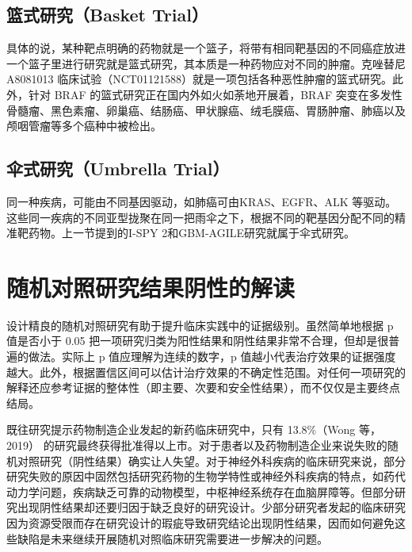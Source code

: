 \documentclass[
  chinese-hans,
  letterpaper,
  DIV=11,
  numbers=noendperiod]{scrreprt}
\begin{document}
\subsection{篮式研究（Basket
Trial）}\label{ux7beeux5f0fux7814ux7a76basket-trial}

具体的说，某种靶点明确的药物就是一个篮子，将带有相同靶基因的不同癌症放进一个篮子里进行研究就是篮式研究，其本质是一种药物应对不同的肿瘤。克唑替尼
A8081013
临床试验（NCT01121588）就是一项包括各种恶性肿瘤的篮式研究。此外，针对
BRAF 的篮式研究正在国内外如火如荼地开展着，BRAF
突变在多发性骨髓瘤、黑色素瘤、卵巢癌、结肠癌、甲状腺癌、绒毛膜癌、胃肠肿瘤、肺癌以及颅咽管瘤等多个癌种中被检出。

\subsection{伞式研究（Umbrella
Trial）}\label{ux4f1eux5f0fux7814ux7a76umbrella-trial}

同一种疾病，可能由不同基因驱动，如肺癌可由KRAS、EGFR、ALK
等驱动。这些同一疾病的不同亚型拢聚在同一把雨伞之下，根据不同的靶基因分配不同的精准靶药物。上一节提到的I-SPY
2和GBM-AGILE研究就属于伞式研究。

\section{随机对照研究结果阴性的解读}\label{ux968fux673aux5bf9ux7167ux7814ux7a76ux7ed3ux679cux9634ux6027ux7684ux89e3ux8bfb}

设计精良的随机对照研究有助于提升临床实践中的证据级别。虽然简单地根据 p
值是否小于 0.05
把一项研究归类为阳性结果和阴性结果非常不合理，但却是很普遍的做法。实际上
p 值应理解为连续的数字，p
值越小代表治疗效果的证据强度越大。此外，根据置信区间可以估计治疗效果的不确定性范围。对任何一项研究的解释还应参考证据的整体性（即主要、次要和安全性结果），而不仅仅是主要终点结局。

既往研究提示药物制造企业发起的新药临床研究中，只有 13.8\%（Wong
等，2019）
的研究最终获得批准得以上市。对于患者以及药物制造企业来说失败的随机对照研究（阴性结果）确实让人失望。对于神经外科疾病的临床研究来说，部分研究失败的原因中固然包括研究药物的生物学特性或神经外科疾病的特点，如药代动力学问题，疾病缺乏可靠的动物模型，中枢神经系统存在血脑屏障等。但部分研究出现阴性结果却还要归因于缺乏良好的研究设计。少部分研究者发起的临床研究因为资源受限而存在研究设计的瑕疵导致研究结论出现阴性结果，因而如何避免这些缺陷是未来继续开展随机对照临床研究需要进一步解决的问题。
\end{document}
